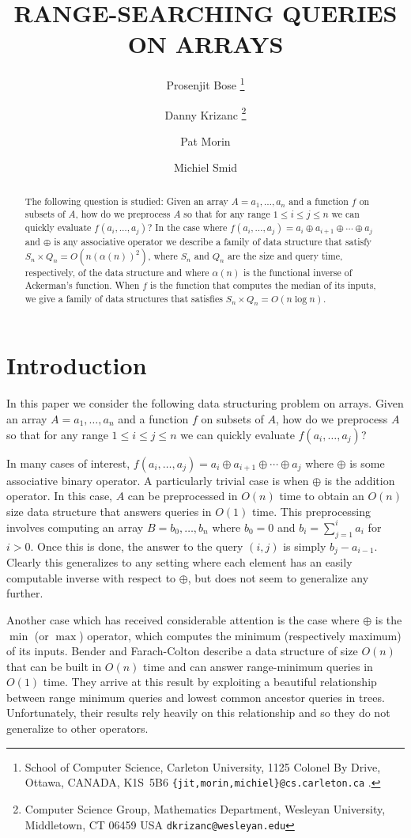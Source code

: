 \documentclass[lotsofwhite]{patmorin}
\title{\MakeUppercase{Range-Searching Queries on Arrays}}
\author{Prosenjit Bose%
	\thanks{School of Computer Science, 
		Carleton University, 
		1125 Colonel By Drive, 
		Ottawa, CANADA, K1S~5B6 \newline
	\texttt{\{jit,morin,michiel\}@cs.carleton.ca} .}
	\and Danny Krizanc%
	\thanks{Computer Science Group,
		Mathematics Department, 
 		Wesleyan University,
		Middletown, CT 06459 USA \newline
		\texttt{dkrizanc@wesleyan.edu}}
	\and Pat Morin\footnotemark[1] 
	\and Michiel Smid\footnotemark[1]}
\date{}
\begin{document}
\maketitle

\begin{abstract}
The following question is studied: Given an array $A=a_1,\ldots,a_n$
and a function $f$ on subsets of $A$, how do we preprocess $A$ so that
for any range $1\le i\le j\le n$ we can quickly evaluate
$f(a_i,\ldots,a_j)$?  In the case where $f(a_i,\ldots,a_j)=a_i\oplus
a_{i+1}\oplus\cdots\oplus a_j$ and $\oplus$ is any associative
operator we describe a family of data structure that satisfy
$S_n\times Q_n=O(n(\alpha(n))^2)$, where $S_n$ and $Q_n$ are the size and
query time, respectively, of the data structure and where $\alpha(n)$
is the functional inverse of Ackerman's function.  When $f$ is the
function that computes the median of its inputs, we give a family of
data structures that satisfies $S_n\times Q_n=O(n\log n)$.
\end{abstract}

\section{Introduction}

In this paper we consider the following data structuring problem on
arrays.  Given an array $A=a_1,\ldots,a_n$ and a function $f$ on
subsets of $A$, how do we preprocess $A$ so that for any range $1\le
i\le j\le n$ we can quickly evaluate $f(a_i,\ldots,a_j)$?

In many cases of interest, $f(a_i,\ldots,a_j)=a_i\oplus
a_{i+1}\oplus\cdots\oplus a_j$ where $\oplus$ is some associative
binary operator.  A particularly trivial case is when $\oplus$ is the
addition operator.  In this case, $A$ can be preprocessed in $O(n)$
time to obtain an $O(n)$ size data structure that answers queries in
$O(1)$ time.  This preprocessing involves computing an array
$B=b_0,\ldots,b_n$ where $b_0=0$ and $b_i=\sum_{j=1}^i a_i$ for $i>0$.
Once this is done, the answer to the query $(i,j)$ is simply
$b_j-a_{i-1}$.  Clearly this generalizes to any setting where each
element has an easily computable inverse with respect to $\oplus$, but
does not seem to generalize any further.

Another case which has received considerable attention is the case
where $\oplus$ is the $\min$ (or $\max$) operator, which computes the
minimum (respectively maximum) of its inputs.  Bender and
Farach-Colton \cite{bfc00} describe a data structure of size $O(n)$
that can be built in $O(n)$ time and can answer range-minimum queries
in $O(1)$ time.  They arrive at this result by exploiting a beautiful
relationship between range minimum queries and lowest common ancestor
queries in trees.  Unfortunately, their results rely heavily on this
relationship and so they do not generalize to other operators.
\end{document}
